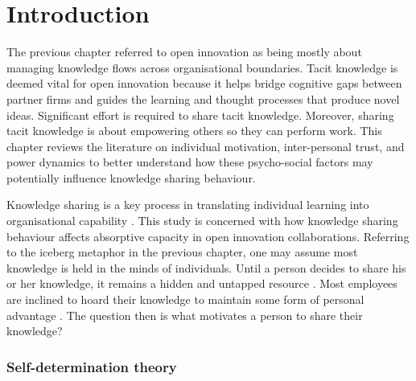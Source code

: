 
\section{Introduction}

The previous chapter referred to open innovation as being mostly about managing knowledge flows across organisational boundaries. Tacit knowledge is deemed vital for open innovation because it helps bridge cognitive gaps between partner firms and guides the learning and thought processes that produce novel ideas. Significant effort is required to share tacit knowledge. Moreover, sharing tacit knowledge is about empowering others so they can perform work. This chapter reviews the literature on individual motivation, inter-personal trust, and power dynamics to better understand how these psycho-social factors may potentially influence knowledge sharing behaviour. \medskip

Knowledge sharing is a key process in translating individual learning into organisational capability \citep{lam2010knowledge}. This study is concerned with how knowledge sharing behaviour affects absorptive capacity in open innovation collaborations. Referring to the iceberg metaphor in the previous chapter, one may assume most knowledge is held in the minds of individuals. Until a person decides to share his or her knowledge, it remains a hidden and untapped resource \citep{davenport1998working}. Most employees are inclined to hoard their knowledge to maintain some form of personal advantage \citep{riege2005three,milne2007motivation}. The question then is what motivates a person to share their knowledge?  \medskip

\subsubsection{Self-determination theory}

